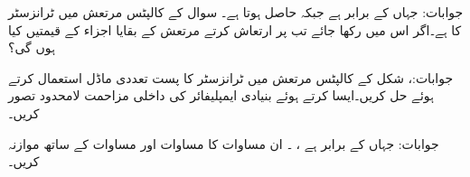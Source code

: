جوابات: جہاں  کے برابر ہے جبکہ  حاصل ہوتا ہے۔
سوال  کے کالپٹس مرتعش میں ٹرانزسٹر کا  ہے۔اگر اس میں  رکھا جائے تب  پر ارتعاش کرتے مرتعش کے بقایا اجزاء کے قیمتیں کیا ہوں گی؟

جوابات:، 
شکل  کے کالپٹس مرتعش میں ٹرانزسٹر کا پست تعددی ماڈل استعمال کرتے ہوئے حل کریں۔ایسا کرتے ہوئے بنیادی ایمپلیفائر کی داخلی مزاحمت  لامحدود تصور کریں۔

جوابات: جہاں  کے برابر ہے ، ۔ ان مساوات کا مساوات  اور مساوات  کے ساتھ موازنہ کریں۔

